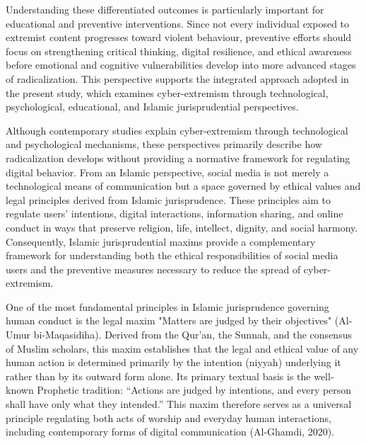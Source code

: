 \documentclass[10pt]{NSP1}
\begin{document}
Understanding these differentiated outcomes is particularly important for educational and preventive interventions. Since not every individual exposed to extremist content progresses toward violent behaviour, preventive efforts should focus on strengthening critical thinking, digital resilience, and ethical awareness before emotional and cognitive vulnerabilities develop into more advanced stages of radicalization. This perspective supports the integrated approach adopted in the present study, which examines cyber-extremism through technological, psychological, educational, and Islamic jurisprudential perspectives.

\par\medskip{}\smallskip

Although contemporary studies explain cyber-extremism through technological and psychological mechanisms, these perspectives primarily describe how radicalization develops without providing a normative framework for regulating digital behavior. From an Islamic perspective, social media is not merely a technological means of communication but a space governed by ethical values and legal principles derived from Islamic jurisprudence. These principles aim to regulate users' intentions, digital interactions, information sharing, and online conduct in ways that preserve religion, life, intellect, dignity, and social harmony. Consequently, Islamic jurisprudential maxims provide a complementary framework for understanding both the ethical responsibilities of social media users and the preventive measures necessary to reduce the spread of cyber-extremism.

\par\medskip{}\smallskip

One of the most fundamental principles in Islamic jurisprudence governing human conduct is the legal maxim "Matters are judged by their objectives" (Al-Umur bi-Maqasidiha). Derived from the Qur'an, the Sunnah, and the consensus of Muslim scholars, this maxim establishes that the legal and ethical value of any human action is determined primarily by the intention (niyyah) underlying it rather than by its outward form alone. Its primary textual basis is the well-known Prophetic tradition: “Actions are judged by intentions, and every person shall have only what they intended.” This maxim therefore serves as a universal principle regulating both acts of worship and everyday human interactions, including contemporary forms of digital communication (Al-Ghamdi, 2020).
\end{document}
